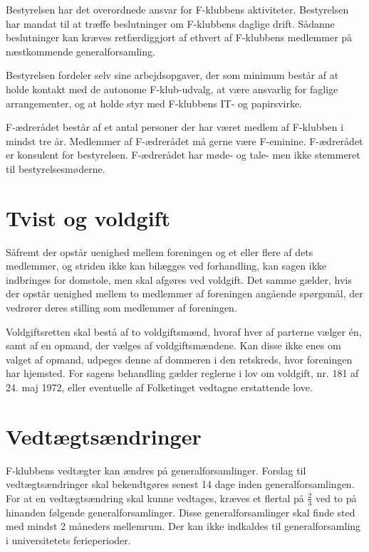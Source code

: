 \documentclass[a4paper,12pt,danish]{article}
\begin{document}
\begin{list}
\item Bestyrelsen har det overordnede ansvar for F-klubbens
  aktiviteter. Bestyrelsen har mandat til at tr{\ae}ffe beslutninger om
  F-klubbens daglige drift. S{\aa}danne beslutninger kan kr{\ae}ves
  retf{\ae}rdiggjort af ethvert af F-klubbens medlemmer p{\aa} n{\ae}stkommende
  generalforsamling.

  
\item Bestyrelsen fordeler selv sine arbejdsopgaver, der som minimum
  best{\aa}r af at holde kontakt med de autonome F-klub-udvalg, at
  v{\ae}re ansvarlig for faglige arrangementer, og at holde styr med
  F-klubbens IT- og papirsvirke.


\item F-{\ae}drer{\aa}det best{\aa}r af et antal
  personer der har v{\ae}ret medlem af F-klubben i mindst tre {\aa}r.
  Medlemmer af F-{\ae}drer{\aa}det m{\aa} gerne v{\ae}re F-eminine.
  F-{\ae}drer{\aa}det er konsulent for bestyrelsen. F-{\ae}drer{\aa}det
  har m{\o}de- og tale- men ikke stemmeret til bestyrelsesm{\o}derne.

\section{Tvist og voldgift}

\item S{\aa}fremt der opst{\aa}r uenighed mellem foreningen og et
  eller flere af dets medlemmer, og striden ikke kan bil{\ae}gges ved
  forhandling, kan sagen ikke indbringes for domstole, men skal
  afg{\o}res ved voldgift. Det samme g{\ae}lder, hvis der opst{\aa}r
  uenighed mellem to medlemmer af foreningen ang{\aa}ende
  sp{\o}rgsm{\aa}l, der vedr{\o}rer deres stilling som medlemmer af
  foreningen. 
  
  Voldgiftsretten skal best{\aa} af to voldgiftsm{\ae}nd, hvoraf hver
  af parterne v{\ae}lger \'{e}n, samt af en opmand, der v{\ae}lges af
  voldgiftsm{\ae}ndene. Kan disse ikke enes om valget af opmand,
  udpeges denne af dommeren i den retskreds, hvor foreningen har
  hjemsted. For sagens behandling g{\ae}lder reglerne i lov om
  voldgift, nr. 181 af 24. maj 1972, eller eventuelle af Folketinget
  vedtagne erstattende love.

\section{Vedt{\ae}gts{\ae}ndringer}
  
\item F-klubbens vedt{\ae}gter kan {\ae}ndres p{\aa}
  generalforsamlinger. Forslag til vedt{\ae}gts{\ae}ndringer skal
  bekendtg{\o}res senest 14 dage inden generalforsamlingen. For at en
  vedt{\ae}gts{\ae}ndring skal kunne vedtages, kr{\ae}ves et flertal
  p{\aa} $\frac{2}{3}$ ved to p{\aa} hinanden f{\o}lgende
  generalforsamlinger. Disse generalforsamlinger skal finde sted med
  mindst 2 m{\aa}neders mellemrum.
  Der kan ikke indkaldes til generalforsamling i universitetets ferieperioder.

\end{list}
\end{document}
